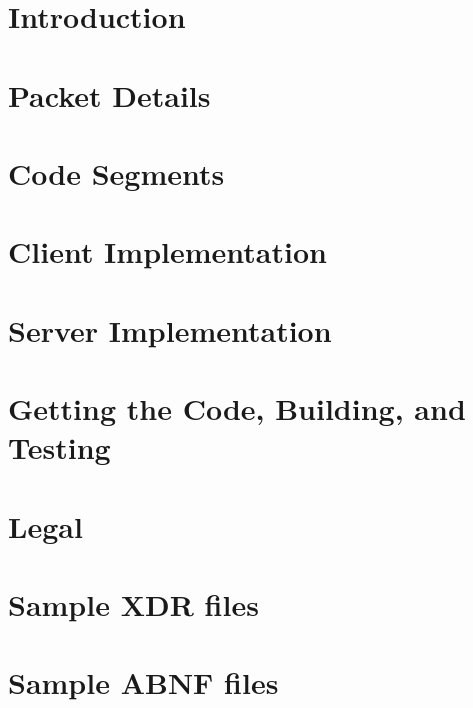\documentclass[2pt]{book}
\begin{document}
\tableofcontents

\mainmatter
\chapter{Introduction}

\chapter{Packet Details}

\chapter{Code Segments}







\chapter{Client Implementation}

\chapter{Server Implementation}

\chapter{Getting the Code, Building, and Testing}



\chapter{Legal}


\appendix
\chapter{Sample XDR files}
\chapter{Sample ABNF files}

\backmatter
\listoffigures
\listoftables
\end{document}
